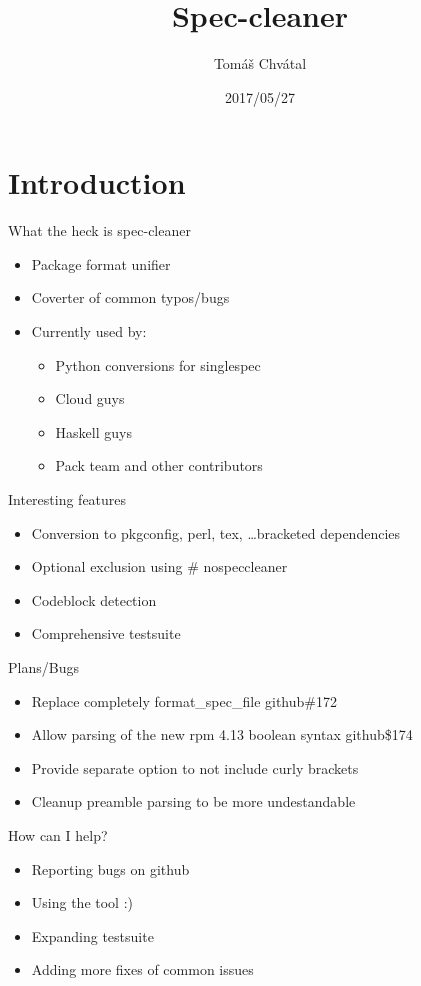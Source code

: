 \documentclass{beamer}
\author{Tom\'{a}\v{s} Chv\'{a}tal\newline {\small tchvatal@suse.com}\newline {\small Packaging/L3 - Packaging}}
\title{Spec-cleaner}
\date{2017/05/27}
\begin{document}
\begin{frame}[t,plain]
\titlepage
\end{frame}

\section{Introduction}

\begin{frame}[t]{What the heck is spec-cleaner}
	\begin{itemize}
	\item Package format unifier
	\item Coverter of common typos/bugs
	\item Currently used by:
		\begin{itemize}
		\item Python conversions for singlespec
		\item Cloud guys
		\item Haskell guys
		\item Pack team and other contributors
		\end{itemize}
	\end{itemize}
\end{frame}

\begin{frame}[t]{Interesting features}
	\begin{itemize}
	\item Conversion to pkgconfig, perl, tex, \ldots bracketed dependencies
	\item Optional exclusion using \# nospeccleaner
	\item Codeblock detection
	\item Comprehensive testsuite
	\end{itemize}
\end{frame}

\begin{frame}[t]{Plans/Bugs}
	\begin{itemize}
	\item Replace completely format\_spec\_file github\#172
	\item Allow parsing of the new rpm 4.13 boolean syntax github\$174
	\item Provide separate option to not include curly brackets
	\item Cleanup preamble parsing to be more undestandable
	\end{itemize}
\end{frame}


\begin{frame}[t]{How can I help?}
	\begin{itemize}
	\item Reporting bugs on github
	\item Using the tool :)
	\item Expanding testsuite
	\item Adding more fixes of common issues
	\end{itemize}
\end{frame}
\end{document}

